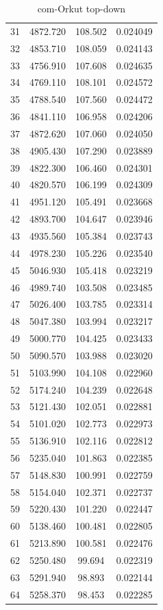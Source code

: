 \documentclass[10pt,twocolumn,letterpaper]{article}
\begin{document}
\begin{table}[h]
\begin{tabular}{@{}c|ccc@{}}
31 & 4872.720 & 108.502 & 0.024049 \\
32 & 4853.710 & 108.059 & 0.024143 \\
33 & 4756.910 & 107.608 & 0.024635 \\
34 & 4769.110 & 108.101 & 0.024572 \\
35 & 4788.540 & 107.560 & 0.024472 \\
36 & 4841.110 & 106.958 & 0.024206 \\
37 & 4872.620 & 107.060 & 0.024050 \\
38 & 4905.430 & 107.290 & 0.023889 \\
39 & 4822.300 & 106.460 & 0.024301 \\
40 & 4820.570 & 106.199 & 0.024309 \\
41 & 4951.120 & 105.491 & 0.023668 \\
42 & 4893.700 & 104.647 & 0.023946 \\
43 & 4935.560 & 105.384 & 0.023743 \\
44 & 4978.230 & 105.226 & 0.023540 \\
45 & 5046.930 & 105.418 & 0.023219 \\
46 & 4989.740 & 103.508 & 0.023485 \\
47 & 5026.400 & 103.785 & 0.023314 \\
48 & 5047.380 & 103.994 & 0.023217 \\
49 & 5000.770 & 104.425 & 0.023433 \\
50 & 5090.570 & 103.988 & 0.023020 \\
51 & 5103.990 & 104.108 & 0.022960 \\
52 & 5174.240 & 104.239 & 0.022648 \\
53 & 5121.430 & 102.051 & 0.022881 \\
54 & 5101.020 & 102.773 & 0.022973 \\
55 & 5136.910 & 102.116 & 0.022812 \\
56 & 5235.040 & 101.863 & 0.022385 \\
57 & 5148.830 & 100.991 & 0.022759 \\
58 & 5154.040 & 102.371 & 0.022737 \\
59 & 5220.430 & 101.220 & 0.022447 \\
60 & 5138.460 & 100.481 & 0.022805 \\
61 & 5213.890 & 100.581 & 0.022476 \\
62 & 5250.480 & 99.694 & 0.022319 \\
63 & 5291.940 & 98.893 & 0.022144 \\
64 & 5258.370 & 98.453 & 0.022285 \\
\bottomrule
\end{tabular}
\caption{com-Orkut top-down}
\end{table}
\end{document}
